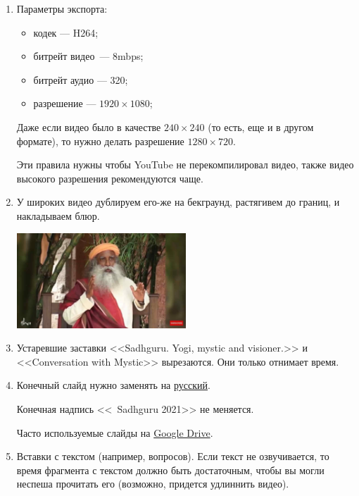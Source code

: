 \documentclass[
a4paper, %
12pt, %
article,
onecolumn, %
openany, %
]{memoir}
\begin{document}
\begin{enumerate}
\item Параметры экспорта:
    \begin{itemize}
    \item кодек --- H264;
    \item битрейт видео~--- 8mbps;
    \item битрейт аудио --- 320;
    \item разрешение --- $1920 \times 1080$;
    \end{itemize}

    Даже если видео было в качестве $240 \times 240$ (то есть, еще и в другом формате), то нужно делать разрешение $1280 \times 720$.

    {\color{gray}Эти правила нужны чтобы YouTube не перекомпилировал видео, также видео высокого разрешения рекомендуются чаще.}

\item У широких видео дублируем его-же на бекграунд, растягивем до границ, и накладываем блюр.

	\begin{center} \includegraphics[width=0.5\textwidth]{tooWide} \end{center}

\item Устаревшие заставки <<Sadhguru. Yogi, mystic and visioner.>> и <<Conversation with Mystic>> вырезаются. {\color{gray}Они только отнимает время.}

\item Конечный слайд нужно заменять на \href{https://drive.google.com/file/d/11NbSgvq8LbxDcy-a2WY5OJTKUZKcZx88/view?usp=sharing}{русский}. 

	Конечная надпись <<\textcopyright\ Sadhguru 2021>> не меняется.

 Часто используемые слайды на 
\href{https://drive.google.com/drive/folders/1O54z3DtKpl90ut0Aa8wYkEEP37e00zPY?usp=sharing}{Google Drive}.

\item Вставки с текстом (например, вопросов). Если текст не озвучивается, то время фрагмента с текстом должно быть достаточным, чтобы вы могли неспеша прочитать его (возможно, придется удлиннить видео).


\end{enumerate}
\end{document}
